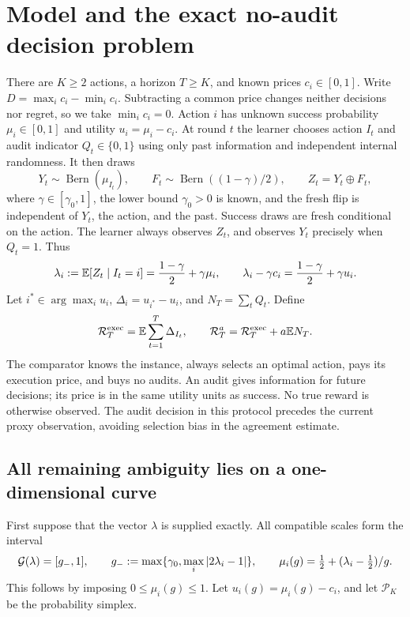 \section{Model and the exact no-audit decision problem}
There are $K\geq2$ actions, a horizon $T\geq K$, and known prices $c_i\in[0,1]$. Write $D=\max_i c_i-\min_i c_i$. Subtracting a common price changes neither decisions nor regret, so we take $\min_i c_i=0$. Action $i$ has unknown success probability $\mu_i\in[0,1]$ and utility $u_i=\mu_i-c_i$. At round $t$ the learner chooses action $I_t$ and audit indicator $Q_t\in\{0,1\}$ using only past information and independent internal randomness. It then draws
\begin{equation}
Y_t\sim\operatorname{Bern}(\mu_{I_t}),\qquad
F_t\sim\operatorname{Bern}((1-\gamma)/2),\qquad Z_t=Y_t\mathbin\oplus F_t,
\label{eq:channel}
\end{equation}
where $\gamma\in[\gamma_0,1]$, the lower bound $\gamma_0>0$ is known, and the fresh flip is independent of $Y_t$, the action, and the past. Success draws are fresh conditional on the action. The learner always observes $Z_t$, and observes $Y_t$ precisely when $Q_t=1$. Thus
\begin{equation}
\lambda_i:=\mathbb{E}[Z_t\mid I_t=i]=\frac{1-\gamma}{2}+\gamma\mu_i,
\qquad
\lambda_i-\gamma c_i=\frac{1-\gamma}{2}+\gamma u_i.
\label{eq:identity}
\end{equation}
Let $i^*\in\arg\max_i u_i$, $\Delta_i=u_{i^*}-u_i$, and $N_T=\sum_tQ_t$. Define
\begin{equation}
\mathcal{R}_T^{\rm exec}=\mathbb{E}\sum_{t=1}^T\Delta_{I_t},\qquad
\mathcal{R}_T^a=\mathcal{R}_T^{\rm exec}+a\mathbb{E} N_T.
\label{eq:regret}
\end{equation}
The comparator knows the instance, always selects an optimal action, pays its execution price, and buys no audits. An audit gives information for future decisions; its price is in the same utility units as success. No true reward is otherwise observed. The audit decision in this protocol precedes the current proxy observation, avoiding selection bias in the agreement estimate.

\subsection{All remaining ambiguity lies on a one-dimensional curve}
First suppose that the vector $\lambda$ is supplied exactly. All compatible scales form the interval
\begin{equation}
\mathcal{G}(\lambda)=[g_-,1],\qquad
 g_-:=\max\{\gamma_0,\max_i|2\lambda_i-1|\},\qquad
 \mu_i(g)=\tfrac12+(\lambda_i-\tfrac12)/g.
\label{eq:compatible}
\end{equation}
This follows by imposing $0\leq\mu_i(g)\leq1$. Let $u_i(g)=\mu_i(g)-c_i$, and let $\mathcal P_K$ be the probability simplex.

